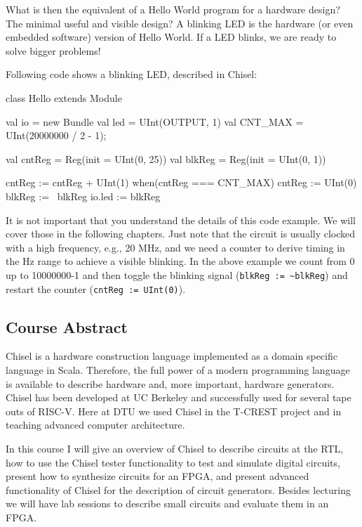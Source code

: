 \documentclass[a4paper]{article}
\newcommand{\code}[1]{{\small{\texttt{#1}}}}
\begin{document}
What is then the equivalent of a Hello World program for a hardware design?
The minimal useful and visible design? A blinking LED is the hardware (or even
embedded software) version of Hello World. If a LED blinks, we are ready to
solve bigger problems!

Following code shows a blinking LED, described in Chisel:

\begin{chisel}
class Hello extends Module {
  val io = new Bundle {
    val led = UInt(OUTPUT, 1)
  }
  val CNT_MAX = UInt(20000000 / 2 - 1);
  
  val cntReg = Reg(init = UInt(0, 25))
  val blkReg = Reg(init = UInt(0, 1))

  cntReg := cntReg + UInt(1)
  when(cntReg === CNT_MAX) {
    cntReg := UInt(0)
    blkReg := ~blkReg
  }
  io.led := blkReg
}

\end{chisel}

It is not important that you understand the details of this code example.
We will cover those in the following chapters. Just note that the circuit is
usually clocked with a high frequency, e.g., 20 MHz, and we need a counter
to derive timing in the Hz range to achieve a visible blinking. In the above
example we count from 0 up to 10000000-1 and then toggle the blinking signal
(\code{blkReg := \textasciitilde blkReg}) and restart the counter (\code{cntReg := UInt(0)}).

\subsection{Course Abstract}

Chisel is a hardware construction language implemented as a domain specific language in Scala. Therefore, the full power of a modern programming language is available to describe hardware and, more important, hardware generators. Chisel has been developed at UC Berkeley and successfully used for several tape outs of RISC-V. Here at DTU we used Chisel in the T-CREST project and in teaching advanced computer architecture.

In this course I will give an overview of Chisel to describe circuits at the RTL, how to use the Chisel tester functionality to test and simulate digital circuits, present how to synthesize circuits for an FPGA, and present advanced functionality of Chisel for the description of circuit generators. Besides lecturing we will have lab sessions to describe small circuits and evaluate them in an FPGA.
\end{document}
